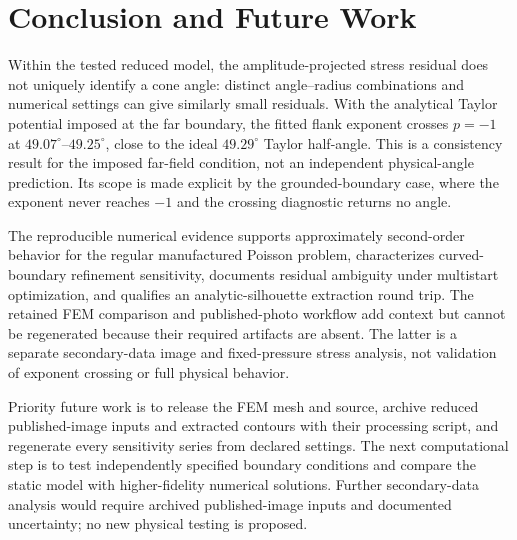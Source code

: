 \section{Conclusion and Future Work}

Within the tested reduced model, the amplitude-projected stress residual does not uniquely identify a cone angle: distinct angle--radius combinations and numerical settings can give similarly small residuals. With the analytical Taylor potential imposed at the far boundary, the fitted flank exponent crosses $p=-1$ at $49.07^\circ$--$49.25^\circ$, close to the ideal $49.29^\circ$ Taylor half-angle. This is a consistency result for the imposed far-field condition, not an independent physical-angle prediction. Its scope is made explicit by the grounded-boundary case, where the exponent never reaches $-1$ and the crossing diagnostic returns no angle.

The reproducible numerical evidence supports approximately second-order behavior for the regular manufactured Poisson problem, characterizes curved-boundary refinement sensitivity, documents residual ambiguity under multistart optimization, and qualifies an analytic-silhouette extraction round trip. The retained FEM comparison and published-photo workflow add context but cannot be regenerated because their required artifacts are absent. The latter is a separate secondary-data image and fixed-pressure stress analysis, not validation of exponent crossing or full physical behavior.


Priority future work is to release the FEM mesh and source, archive reduced published-image inputs and extracted contours with their processing script, and regenerate every sensitivity series from declared settings. The next computational step is to test independently specified boundary conditions and compare the static model with higher-fidelity numerical solutions. Further secondary-data analysis would require archived published-image inputs and documented uncertainty; no new physical testing is proposed.
